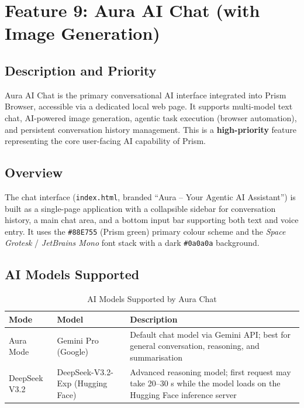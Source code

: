 
\section{Feature 9: Aura AI Chat (with Image Generation)}

\subsection{Description and Priority}
Aura AI Chat is the primary conversational AI interface integrated into Prism Browser, accessible via a dedicated local web page. It supports multi-model text chat, AI-powered image generation, agentic task execution (browser automation), and persistent conversation history management. This is a \textbf{high-priority} feature representing the core user-facing AI capability of Prism.

\subsection{Overview}
The chat interface (\texttt{index.html}, branded ``Aura -- Your Agentic AI Assistant'') is built as a single-page application with a collapsible sidebar for conversation history, a main chat area, and a bottom input bar supporting both text and voice entry. It uses the \texttt{\#88E755} (Prism green) primary colour scheme and the \textit{Space Grotesk} / \textit{JetBrains Mono} font stack with a dark \texttt{\#0a0a0a} background.

\subsection{AI Models Supported}

\begin{longtable}{|p{3.5cm}|p{3.5cm}|p{7cm}|}
\caption{AI Models Supported by Aura Chat} \\
\hline
\textbf{Mode} & \textbf{Model} & \textbf{Description} \\ \hline
\endhead
Aura Mode & Gemini Pro (Google) & Default chat model via Gemini API; best for general conversation, reasoning, and summarisation \\ \hline
DeepSeek V3.2 & DeepSeek-V3.2-Exp (Hugging Face) & Advanced reasoning model; first request may take 20--30 s while the model loads on the Hugging Face inference server \\ \hline
\end{longtable}

